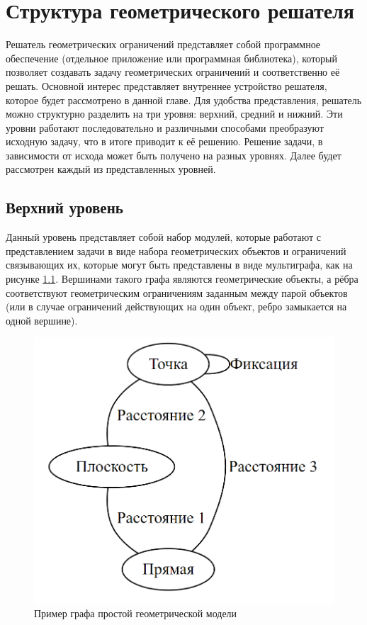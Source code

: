 \chapter{Структура геометрического решателя}\label{ch:geomsolver}

Решатель геометрических ограничений представляет собой программное обеспечение (отдельное приложение или программная библиотека), который позволяет создавать задачу геометрических ограничений и соответственно её решать. Основной интерес представляет внутреннее устройство решателя, которое будет рассмотрено в данной главе. Для удобства представления,  решатель можно структурно разделить на три уровня: верхний, средний и нижний. Эти уровни работают последовательно и различными способами преобразуют исходную задачу, что в итоге приводит к её решению. Решение задачи, в зависимости от исхода может быть получено на разных уровнях. Далее будет рассмотрен каждый из представленных уровней.




\section{Верхний уровень}
Данный уровень представляет собой набор модулей, которые работают с представлением задачи в виде набора геометрических объектов и ограничений связывающих их, которые могут быть представлены в виде  мультиграфа, как на рисунке \ref{fig:im1}. Вершинами такого графа являются геометрические объекты, а рёбра соответствуют геометрическим ограничениям заданным между парой объектов (или в случае ограничений действующих на один объект, ребро замыкается на одной вершине). 

\begin{figure}[h]
	\centering
	\includegraphics[width=0.5\linewidth]{figures/fig_1_model_graph.png}
	\caption{Пример графа простой геометрической модели}
	\label{fig:im1}%
\end{figure}

